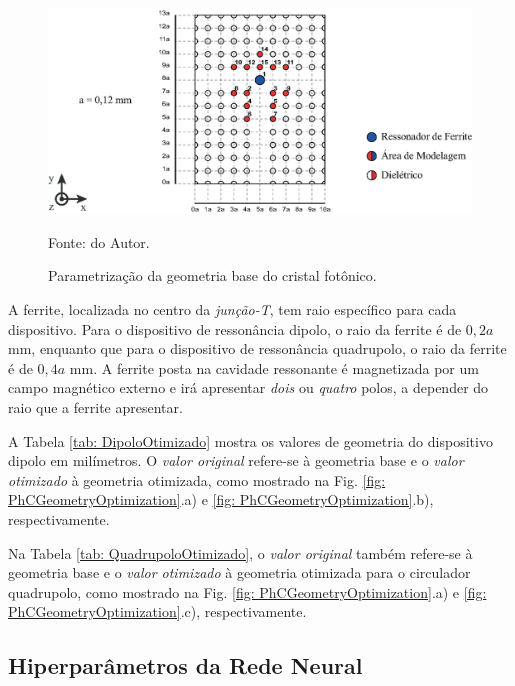 \begin{figure}[H]
    \centering
    \includegraphics{04-Figuras/PhCParametrization.eps}
    \caption{Parametrização da geometria base do cristal fotônico.} \par
    Fonte: do Autor.
    \label{fig: PhCParametrization}
\end{figure}

A ferrite, localizada no centro da \textit{junção-T}, tem raio específico para cada dispositivo. Para o dispositivo de ressonância dipolo, o raio da ferrite é de $0,2a$ mm, enquanto que para o dispositivo de ressonância quadrupolo, o raio da ferrite é de $0,4a$ mm. A ferrite posta na cavidade ressonante é magnetizada por um campo magnético externo e irá apresentar \textit{dois} ou \textit{quatro} polos, a depender do raio que a ferrite apresentar.

A Tabela \ref{tab: DipoloOtimizado} mostra os valores de geometria do dispositivo dipolo em milímetros. O \textit{valor original} refere-se à geometria base e o \textit{valor otimizado} à geometria otimizada, como mostrado na Fig. \ref{fig: PhCGeometryOptimization}.a) e \ref{fig: PhCGeometryOptimization}.b), respectivamente.



Na Tabela \ref{tab: QuadrupoloOtimizado}, o \textit{valor original} também refere-se à geometria base e o \textit{valor otimizado} à geometria otimizada para o circulador quadrupolo, como mostrado na Fig. \ref{fig: PhCGeometryOptimization}.a) e \ref{fig: PhCGeometryOptimization}.c), respectivamente.






\subsection{Hiperparâmetros da Rede Neural}

